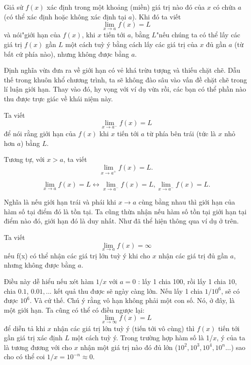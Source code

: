 \begin{definition}
    Giả sử $f(x)$ xác định trong một khoảng (miền) giá trị nào đó của $x$ có chứa $a$ (có thể xác định hoặc không xác định tại $a$). Khi đó ta viết
    \begin{equation*}\lim_{x\rightarrow a}f(x)=L\end{equation*}
và nói\qquad\qquad\qquad "giới hạn của $f(x)$, khi $x$ tiến tới $a$, bằng $L$"\newline nếu chúng ta có thể lấy các giá trị $f(x)$ gần $L$ một cách tuỳ ý bằng cách lấy các giá trị của $x$ đủ gần $a$ (từ bất cứ phía nào), nhưng không được bằng $a$.
\end{definition}

Định nghĩa vừa đưa ra về giới hạn có vẻ khá trừu tượng và thiếu chặt chẽ. Dẫu thế trong khuôn khổ chương trình, ta sẽ không đào sâu vào vấn đề chặt chẽ trong lí luận giới hạn. Thay vào đó, hy vọng với ví dụ vừa rồi, các bạn có thể phần nào thu được trực giác về khái niệm này.\newline
\begin{definition}
    Ta viết \begin{equation*}\lim_{x\rightarrow a^-}f(x)=L\end{equation*}
để nói rằng giới hạn của $f(x)$ khi $x$ tiến tới $a$ từ phía bên trái (tức là $x$ nhỏ hơn $a$) bằng $L$. 
\end{definition}

Tương tự, với $x>a$, ta viết $$\lim_{x\rightarrow a^+}f(x)=L .$$ 
\begin{theorem}
    \begin{equation*}\lim_{x\rightarrow a}f(x)=L \leftrightarrow \lim_{x\rightarrow a^-}f(x)=L, \lim_{x\rightarrow a^-}f(x)=L.\end{equation*}   
\end{theorem}

Nghĩa là nếu giới hạn trái và phái khi $x\rightarrow a$ cùng bằng nhau thì giới hạn của hàm số tại điểm đó là tồn tại.
Ta cũng thừa nhận nếu hàm số tồn tại giới hạn tại điểm nào đó, giới hạn đó là duy nhất. Như đã thể hiện thông qua ví dụ ở trên.


\begin{definition} Ta viết
    \begin{equation*}\lim_{x\rightarrow a}f(x)=\infty\end{equation*}
nếu f(x) có thể nhận các giá trị lớn tuỳ ý khi cho $x$ nhận các giá trị đủ gần $a$, nhưng không được bằng $a$.
\end{definition}
Điều này dễ hiểu nếu xét hàm $1/x$ với $a=0$ : lấy 1 chia 100, rồi lấy 1 chia $10$, chia $0.1$, $0.01,...$ kết quả thu được sẽ ngày càng lớn. Nếu lấy 1 chia $1/10^6$, sẽ có được $10^6$. Và cứ thế.
Chú ý rằng vô hạn không phải một con số. Nó, ở đây, là một giới hạn.\newline
Ta cũng có thể có điều ngược lại:$$\lim_{x\rightarrow\infty}f(x)=L$$ để diễn tả khi $x$ nhận các giá trị lớn tuỳ ý (tiến tới vô cùng) thì $f(x)$ tiến tới gần giá trị xác định $L$ một cách tuỳ ý. Trong trường hợp hàm số là 1/$x$, ý của ta là tương đương với cho $x$ nhận một giá trị nào đó đủ lớn ($10^2,10^3,10^4,10^n...$) sao cho có thể coi $1/x =10^{-n}\approx 0.$ 

